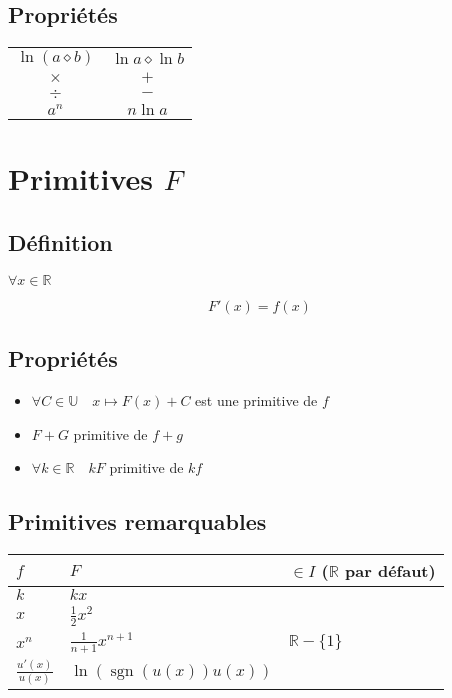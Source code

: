 \documentclass{article}
\newcommand{\R}{\mathds{R}}
\newcommand{\placeholder}{\diamond}
\begin{document}
\label{proprietes_ln}
\subsection{Propriétés}

\begin{table}[h!]
    \centering
    \begin{tabular}{c|c}
        $\ln (a\placeholder b)$ & $\ln a \placeholder \ln b $ \\
        $\times$ & $+$ \\
        $\div$ & $-$ \\\hline
        $a^n$ &  $n\ln a$ \\
    \end{tabular}
\end{table}

\newpage
\section{Primitives $F$}

\subsection{Définition}

$\forall x \in \R$

\[F'(x) = f(x)\]

\subsection{Propriétés}

\begin{itemize}
    \item $\forall C \in \mathds{U}\quad x \mapsto F(x) + C$ est une primitive de $f$
    \item $F + G$ primitive de $f + g$
    \item $\forall k \in \R \quad kF$ primitive de $kf$
\end{itemize}

\subsection{Primitives remarquables}

\begin{table}[H]
    \centering
    \begin{tabular}{lll}
        $f$ & $F$ & $\in I$ ($\R$ par défaut) \\\hline
        $k$ & $kx$ & \\
        $x$ & $\frac{1}{2}x^2$ & \\
	$x^n$ & $\frac{1}{n+1}x^{n+1}$ & $\R -\{1\}  $\\
	$\frac{u'(x)}{u(x)}$ & $\ln (\operatorname{sgn}(u(x)) u(x))$
    \end{tabular}
    \label{tab:primitives_remarquables}
\end{table}
\end{document}
